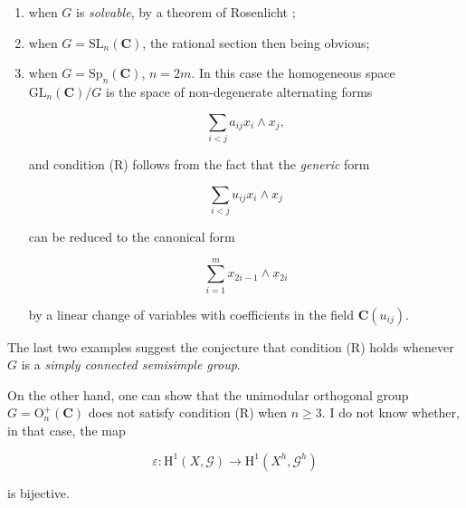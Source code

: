 \begin{enumerate}[label=\emph{\alph*)},leftmargin=2.2em]
\item when $G$ is \emph{solvable}, by a theorem of Rosenlicht ;

\item when $G=\mathrm{SL}_n(\mathbf{C})$, the rational section then being
obvious;

\item when $G=\mathrm{Sp}_n(\mathbf{C})$, $n=2m$. In this case the homogeneous
space $\mathrm{GL}_n(\mathbf{C})/G$ is the space of non-degenerate alternating
forms

\begin{equation*}
\sum_{i<j}a_{ij}x_i\wedge x_j,
\end{equation*}

and condition (R) follows from the fact that the \emph{generic} form

\begin{equation*}
\sum_{i<j}u_{ij}x_i\wedge x_j
\end{equation*}

can be reduced to the canonical form

\begin{equation*}
\sum_{i=1}^{m}x_{2i-1}\wedge x_{2i}
\end{equation*}

by a linear change of variables with coefficients in the field
$\mathbf{C}(u_{ij})$.
\end{enumerate}

The last two examples suggest the conjecture that condition (R) holds whenever
$G$ is a \emph{simply connected semisimple group}.

On the other hand, one can show that the unimodular orthogonal group
$G=\mathrm{O}_n^+(\mathbf{C})$ does not satisfy condition (R) when $n\geqslant3$.
I do not know whether, in that case, the map

\begin{equation*}
\varepsilon:\mathrm{H}^1(X,\mathcal{G})
\longrightarrow\mathrm{H}^1(X^h,\mathcal{G}^h)
\end{equation*}

is bijective.
